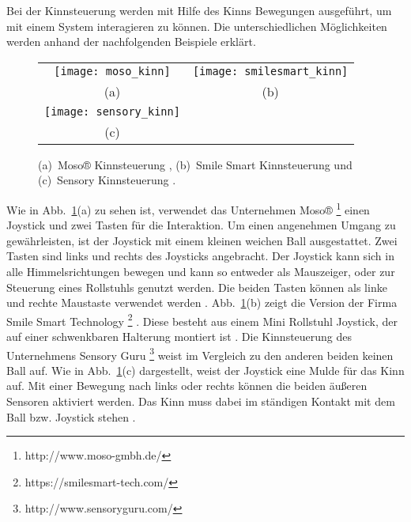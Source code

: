 Bei der Kinnsteuerung werden mit Hilfe des Kinns Bewegungen ausgeführt, um mit einem System interagieren zu können. Die unterschiedlichen Möglichkeiten werden anhand der nachfolgenden Beispiele erklärt.
%
\begin{figure}
\centering\small
\setlength{\tabcolsep}{0mm}	%
\begin{tabular}{c@{\hspace{15mm}}c} %
  \texttt{[image: moso\_kinn]} &
  \texttt{[image: smilesmart\_kinn]}
\\
  (a) & (b)
\\[5pt]	%
  \texttt{[image: sensory\_kinn]}
\\
  (c)
\end{tabular}
%
\caption{(a)~Moso® Kinnsteuerung \cite{MOSO}, (b)~Smile Smart Kinnsteuerung \cite{SMILESMART} und (c)~Sensory Kinnsteuerung \cite{SENSORY}.}
\label{fig:kinn}
\end{figure}
\newline \newline
Wie in Abb.~\ref{fig:kinn}(a) zu sehen ist, verwendet das Unternehmen Moso®%
\footnote{http://www.moso-gmbh.de/}
%
einen Joystick und zwei Tasten für die Interaktion. Um einen angenehmen Umgang zu gewährleisten, ist der Joystick mit einem kleinen weichen Ball ausgestattet. Zwei Tasten sind links und rechts des Joysticks angebracht. Der Joystick kann sich in alle Himmelsrichtungen bewegen und kann so entweder als Mauszeiger, oder zur Steuerung eines Rollstuhls genutzt werden. Die beiden Tasten können als linke und rechte Maustaste verwendet werden \cite{MOSO}.
\newline \newline
Abb.~\ref{fig:kinn}(b) zeigt die Version der Firma Smile Smart Technology%
\footnote{https://smilesmart-tech.com/}
%
. Diese besteht aus einem Mini Rollstuhl Joystick, der auf einer schwenkbaren Halterung montiert ist \cite{SMILESMART}.
\newline \newline
Die Kinnsteuerung des Unternehmens Sensory Guru%
\footnote{http://www.sensoryguru.com/}
%
weist im Vergleich zu den anderen beiden keinen Ball auf. Wie in Abb.~\ref{fig:kinn}(c) dargestellt, weist der Joystick eine Mulde für das Kinn auf. Mit einer Bewegung nach links oder rechts können die beiden äußeren Sensoren aktiviert werden. Das Kinn muss dabei im ständigen Kontakt mit dem Ball bzw. Joystick stehen \cite{SENSORY}. 
